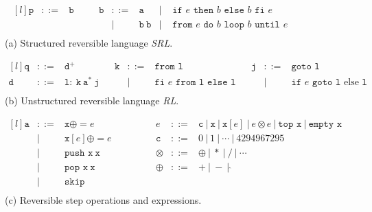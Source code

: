 \begin{figure}[ht]

  \begin{minipage}{\textwidth}
    \center
    $$\begin{matrix*}[l]
      \mathtt{p} & ::= & \mathtt{b} & \quad & \mathtt{b} & ::= & \mathtt{a}             & | & \texttt{ if }e\texttt{ then }b\texttt{ else }b\texttt{ fi }e\\
                 &     &           &        &            &  |  & \mathtt{b}\ \mathtt{b} & | & \texttt{ from }e\texttt{ do }b\texttt{ loop }b\texttt{ until }e\\
    \end{matrix*}$$
    (a) Structured reversible language \textit{SRL}.
  \end{minipage}

  \begin{minipage}{\textwidth}
    \center
    $$\begin{matrix*}[l]
      \mathtt{q} & ::= & \mathtt{d}^+                                      & & \mathtt{k} & ::= & \texttt{from }\mathtt{l} & & \mathtt{j} & ::= & \texttt{goto }\mathtt{l}\\
      \mathtt{d} & ::= & \mathtt{l}:\ \mathtt{k}\ \mathtt{a}^*\ \mathtt{j} &       &            &  |  & \texttt{fi }e\texttt{ from }\mathtt{l}\texttt{ else }\mathtt{l} &
        & & | & \texttt{if }e\texttt{ goto }\mathtt{l}\text{ else }\mathtt{l}\\
    \end{matrix*}$$
    (b) Unstructured reversible language \textit{RL}.
  \end{minipage}

  \begin{minipage}{\textwidth}
    \center
    $$\begin{matrix*}[l]
      \mathtt{a} & ::= & \mathtt{x}\oplus= e & \quad\quad\quad &  e & ::= & \mathtt{c} \ | \ \mathtt{x} \ | \ \mathtt{x}[ e] \ | \  e\otimes e \ | \ \texttt{top }\mathtt{x} \ | \ \texttt{empty }\mathtt{x}\\
                 &  |  & \mathtt{x}[ e]\oplus= e &     & \mathtt{c} & ::= & 0\ | \ 1\ |\ \cdots\ |\ 4294967295\\
                 &  |  & \texttt{push }\mathtt{x}\ \mathtt{x}      &     & \otimes    & ::= & \oplus \ | \ * \ | \ / \ | \ \cdots\\
                 &  |  & \texttt{pop  }\mathtt{x}\ \mathtt{x}      &     & \oplus     & ::= & +  \ | \  -  \ | \  \hat{}\\
                 &  |  & \texttt{skip}\\
    \end{matrix*}$$
    (c) Reversible step operations and expressions.
  \end{minipage}


\end{figure}
